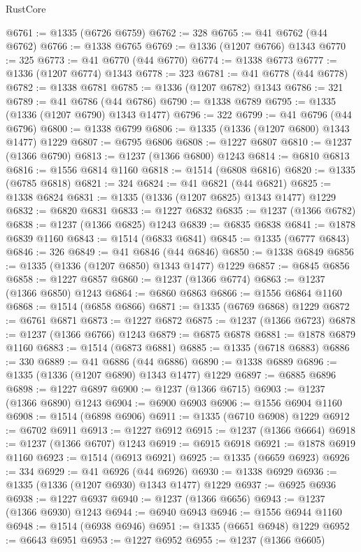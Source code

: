 \begin{lexlean}{RustCore}
\begin{coremodule}
@6761 := @1335 (@6726 @6759)
@6762 := 328
@6765 := @41 @6762 (@44 @6762)
@6766 := @1338 @6765
@6769 := @1336 (@1207 @6766) @1343
@6770 := 325
@6773 := @41 @6770 (@44 @6770)
@6774 := @1338 @6773
@6777 := @1336 (@1207 @6774) @1343
@6778 := 323
@6781 := @41 @6778 (@44 @6778)
@6782 := @1338 @6781
@6785 := @1336 (@1207 @6782) @1343
@6786 := 321
@6789 := @41 @6786 (@44 @6786)
@6790 := @1338 @6789
@6795 := @1335 (@1336 (@1207 @6790) @1343 @1477)
@6796 := 322
@6799 := @41 @6796 (@44 @6796)
@6800 := @1338 @6799
@6806 := @1335 (@1336 (@1207 @6800) @1343 @1477) @1229
@6807 := @6795 @6806
@6808 := @1227 @6807
@6810 := @1237 (@1366 @6790)
@6813 := @1237 (@1366 @6800) @1243
@6814 := @6810 @6813
@6816 := @1556 @6814 @1160
@6818 := @1514 (@6808 @6816)
@6820 := @1335 (@6785 @6818)
@6821 := 324
@6824 := @41 @6821 (@44 @6821)
@6825 := @1338 @6824
@6831 := @1335 (@1336 (@1207 @6825) @1343 @1477) @1229
@6832 := @6820 @6831
@6833 := @1227 @6832
@6835 := @1237 (@1366 @6782)
@6838 := @1237 (@1366 @6825) @1243
@6839 := @6835 @6838
@6841 := @1878 @6839 @1160
@6843 := @1514 (@6833 @6841)
@6845 := @1335 (@6777 @6843)
@6846 := 326
@6849 := @41 @6846 (@44 @6846)
@6850 := @1338 @6849
@6856 := @1335 (@1336 (@1207 @6850) @1343 @1477) @1229
@6857 := @6845 @6856
@6858 := @1227 @6857
@6860 := @1237 (@1366 @6774)
@6863 := @1237 (@1366 @6850) @1243
@6864 := @6860 @6863
@6866 := @1556 @6864 @1160
@6868 := @1514 (@6858 @6866)
@6871 := @1335 (@6769 @6868) @1229
@6872 := @6761 @6871
@6873 := @1227 @6872
@6875 := @1237 (@1366 @6723)
@6878 := @1237 (@1366 @6766) @1243
@6879 := @6875 @6878
@6881 := @1878 @6879 @1160
@6883 := @1514 (@6873 @6881)
@6885 := @1335 (@6718 @6883)
@6886 := 330
@6889 := @41 @6886 (@44 @6886)
@6890 := @1338 @6889
@6896 := @1335 (@1336 (@1207 @6890) @1343 @1477) @1229
@6897 := @6885 @6896
@6898 := @1227 @6897
@6900 := @1237 (@1366 @6715)
@6903 := @1237 (@1366 @6890) @1243
@6904 := @6900 @6903
@6906 := @1556 @6904 @1160
@6908 := @1514 (@6898 @6906)
@6911 := @1335 (@6710 @6908) @1229
@6912 := @6702 @6911
@6913 := @1227 @6912
@6915 := @1237 (@1366 @6664)
@6918 := @1237 (@1366 @6707) @1243
@6919 := @6915 @6918
@6921 := @1878 @6919 @1160
@6923 := @1514 (@6913 @6921)
@6925 := @1335 (@6659 @6923)
@6926 := 334
@6929 := @41 @6926 (@44 @6926)
@6930 := @1338 @6929
@6936 := @1335 (@1336 (@1207 @6930) @1343 @1477) @1229
@6937 := @6925 @6936
@6938 := @1227 @6937
@6940 := @1237 (@1366 @6656)
@6943 := @1237 (@1366 @6930) @1243
@6944 := @6940 @6943
@6946 := @1556 @6944 @1160
@6948 := @1514 (@6938 @6946)
@6951 := @1335 (@6651 @6948) @1229
@6952 := @6643 @6951
@6953 := @1227 @6952
@6955 := @1237 (@1366 @6605)

\end{coremodule}
\end{lexlean}

